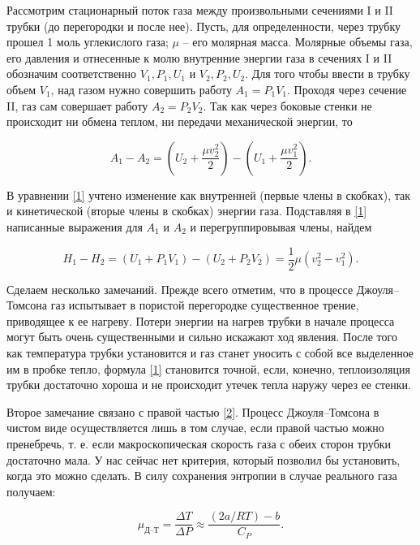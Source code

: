 \documentclass[a4paper,12pt]{article} %
\begin{document}
Рассмотрим стационарный поток газа между произвольными сечениями I и II трубки (до перегородки и после нее). Пусть, для определенности, через трубку прошел 1 моль углекислого газа; $ \mu $ -- его молярная масса. Молярные объемы газа, его давления и отнесенные к молю внутренние энергии газа в сечениях I и II обозначим соответственно $ V_1, P_1, U_1 $ и $ V_2, P_2, U_2 $. Для того чтобы ввести в трубку объем $ V_1 $, над газом нужно совершить работу $ A_1 = P_1V_1 $. Проходя через сечение II, газ сам совершает работу $ A_2 = P_2V_2 $. Так как через боковые стенки не происходит ни обмена теплом, ни передачи механической энергии, то

\begin{equation}\label{1}
A_1-A_2=\left(U_2+\frac{\mu v_2^2}{2}\right) - \left(U_1 + \frac{\mu v_1^2}{2}\right).
\end{equation}

В уравнении \eqref{1} учтено изменение как внутренней (первые члены в скобках), так и кинетической (вторые члены в скобках) энергии газа. Подставляя в \eqref{1} написанные выражения для $ A_1 $ и $ A_2 $ и перегруппировывая члены, найдем

\begin{equation}\label{2}
H_1-H_2=\left(U_1+P_1V_1\right) - \left(U_2 + P_2V_2\right) = \frac{1}{2} \mu \left(v^2_2-v^2_1\right).
\end{equation}

Сделаем несколько замечаний. Прежде всего отметим, что в процессе Джоуля–Томсона газ испытывает в пористой перегородке существенное трение, приводящее к ее нагреву. Потери энергии на нагрев трубки в начале процесса могут быть очень существенными и сильно искажают ход явления. После того как температура трубки установится и газ станет уносить с собой все выделенное им в пробке тепло, формула \eqref{1} становится точной, если, конечно, теплоизоляция трубки достаточно хороша и не происходит утечек тепла наружу через ее стенки.

Второе замечание связано с правой частью \eqref{2}. Процесс Джоуля–Томсона в чистом виде осуществляется лишь в том случае, если правой частью можно пренебречь, т. е. если макроскопическая скорость газа с обеих сторон трубки достаточно мала. У нас сейчас нет критерия, который позволил бы установить, когда это можно сделать. В силу сохранения энтропии в случае реального газа получаем:

\begin{equation}\label{3}
\mu_\text{Д--Т} = \frac{\Delta T}{\Delta P} \approx \frac{(2a/RT) - b}{C_P}.
\end{equation}
\end{document}
